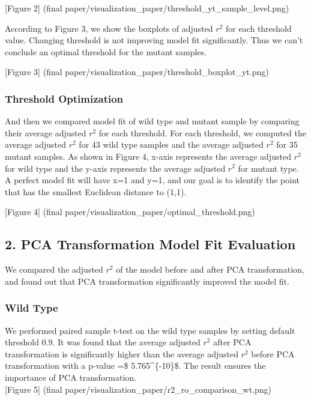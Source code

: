 \documentclass[10pt,letterpaper]{article}
\begin{document}
{[}Figure 2{]} (final
paper/visualization\_paper/threshold\_yt\_sample\_level.png)

According to Figure 3, we show the boxplots of adjusted \(r^2\) for each
threshold value. Changing threshold is not improving model fit
significantly. Thus we can't conclude an optimal threshold for the
mutant samples.

{[}Figure 3{]} (final
paper/visualization\_paper/threshold\_boxplot\_yt.png)

\subsubsection{Threshold Optimization}\label{threshold-optimization}

And then we compared model fit of wild type and mutant sample by
comparing their average adjusted \(r^2\) for each threshold. For each
threshold, we computed the average adjusted \(r^2\) for 43 wild type
samples and the average adjusted \(r^2\) for 35 mutant samples. As shown
in Figure 4, x-axis represents the average adjusted \(r^2\) for wild
type and the y-axis represents the average adjusted \(r^2\) for mutant
type. A perfect model fit will have x=1 and y=1, and our goal is to
identify the point that has the smallest Euclidean distance to (1,1).

{[}Figure 4{]} (final paper/visualization\_paper/optimal\_threshold.png)

\subsection{2. PCA Transformation Model Fit
Evaluation}\label{pca-transformation-model-fit-evaluation}

We compared the adjusted \(r^2\) of the model before and after PCA
transformation, and found out that PCA transformation significantly
improved the model fit.

\subsubsection{Wild Type}\label{wild-type-1}

We performed paired sample t-test on the wild type samples by setting
default threshold 0.9. It was found that the average adjusted \(r^2\)
after PCA transformation is significantly higher than the average
adjusted \(r^2\) before PCA transformation with a p-value =\$
5.765\^{}\{-10\}\$. The result ensures the importance of PCA
transformation.\\
{[}Figure 5{]} (final
paper/visualization\_paper/r2\_ro\_comparison\_wt.png)
\end{document}

